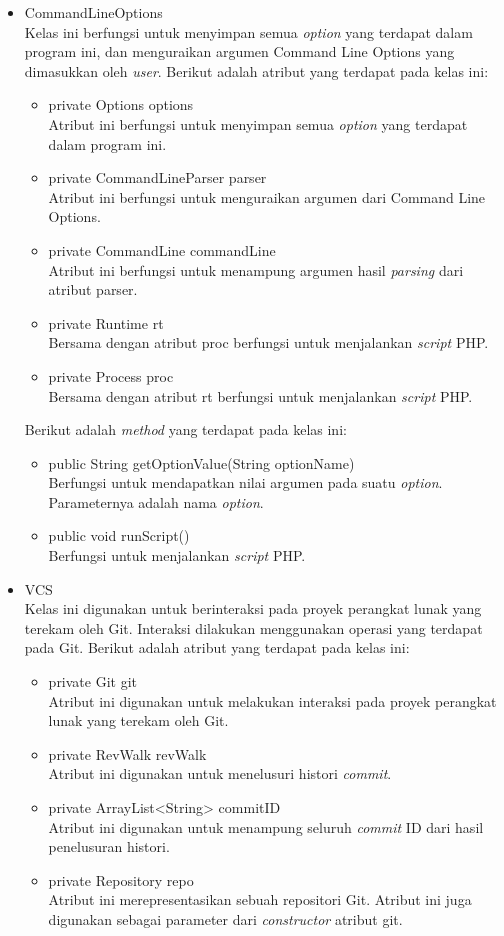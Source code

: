 \begin{itemize}
\item CommandLineOptions\\
Kelas ini berfungsi untuk menyimpan semua \textit{option} yang terdapat dalam program ini, dan menguraikan argumen Command Line Options yang dimasukkan oleh \textit{user}.  
Berikut adalah atribut yang terdapat pada kelas ini:
\begin{itemize}
	\item private Options options\\
	Atribut ini berfungsi untuk menyimpan semua \textit{option} yang terdapat dalam program ini.
    \item private CommandLineParser parser\\
    Atribut ini berfungsi untuk menguraikan argumen dari Command Line Options.
    \item private CommandLine commandLine\\
    Atribut ini berfungsi untuk menampung argumen hasil \textit{parsing} dari atribut parser.
    \item private Runtime rt\\
    Bersama dengan atribut proc berfungsi untuk menjalankan \textit{script} PHP.
    \item private Process proc\\
    Bersama dengan atribut rt berfungsi untuk menjalankan \textit{script} PHP.
\end{itemize}
Berikut adalah \textit{method} yang terdapat pada kelas ini:
\begin{itemize}
\item public String getOptionValue(String optionName)\\
Berfungsi untuk mendapatkan nilai argumen pada suatu \textit{option}. Parameternya adalah nama \textit{option}.
\item public void runScript()\\
Berfungsi untuk menjalankan \textit{script} PHP.
\end{itemize}
\item VCS\\
Kelas ini digunakan untuk berinteraksi pada proyek perangkat lunak yang terekam oleh Git. Interaksi dilakukan menggunakan operasi yang terdapat pada Git. Berikut adalah atribut yang terdapat pada kelas ini:
\begin{itemize}
   \item private Git git\\
   Atribut ini digunakan untuk melakukan interaksi pada proyek perangkat lunak yang terekam oleh Git.
	\item private RevWalk revWalk\\
	Atribut ini digunakan untuk menelusuri histori \textit{commit}.
    \item private ArrayList<String> commitID\\
    Atribut ini digunakan untuk menampung seluruh \textit{commit} ID dari hasil penelusuran histori.
    \item private Repository repo\\
    Atribut ini merepresentasikan sebuah repositori Git. Atribut ini juga digunakan sebagai parameter dari \textit{constructor} atribut git.
\end{itemize}


\end{itemize}
